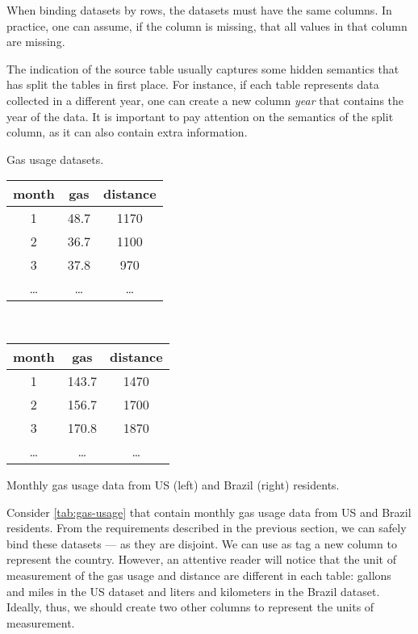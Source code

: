 When binding datasets by rows, the datasets must have the same columns.  In practice,
one can assume, if the column is missing, that all values in that column are missing.

The indication of the source table usually captures some hidden semantics that has split
the tables in first place. For instance, if each table represents data collected in a
different year, one can create a new column \emph{year} that contains the year of the
data.  It is important to pay attention on the semantics of the split column, as it can
also contain extra information.

\begin{tablebox}[label=tab:gas-usage]{Gas usage datasets.}
  \centering
  \begin{tabular}{ccc}
    \toprule
    \textbf{month} & \textbf{gas} & \textbf{distance} \\
    \midrule
    1 & 48.7 & 1170 \\
    2 & 36.7 & 1100 \\
    3 & 37.8 & 970 \\
    \dots & \dots & \dots \\
    \bottomrule
  \end{tabular}
  ~
  \begin{tabular}{ccc}
    \toprule
    \textbf{month} & \textbf{gas} & \textbf{distance} \\
    \midrule
    1 & 143.7 & 1470 \\
    2 & 156.7 & 1700 \\
    3 & 170.8 & 1870 \\
    \dots & \dots & \dots \\
    \bottomrule
  \end{tabular}
  \tcblower
  Monthly gas usage data from US (left) and Brazil (right) residents.
\end{tablebox}

Consider \cref{tab:gas-usage} that contain monthly gas usage data from
US and Brazil residents.  From the requirements described in the previous section, we can
safely bind these datasets --- as they are disjoint.  We can use as tag a new column to
represent the country.  However, an attentive reader will notice that the unit of
measurement of the gas usage and distance are different in each table: gallons and miles
in the US dataset and liters and kilometers in the Brazil dataset.  Ideally, thus, we
should create two other columns to represent the units of measurement.

